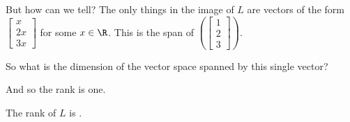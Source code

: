 \documentclass{ximera}
\begin{document}
\begin{question}
\begin{solution}
\begin{hint}
\begin{question}
        \begin{solution}
          \begin{multiple-choice}
          \end{multiple-choice}
        \end{solution}

        But how can we tell?  The only things in the image of $L$ are
        vectors of the form $\begin{bmatrix} x \\ 2x \\
          3x \end{bmatrix}$ for some $x \in \R$.  This is the span of $\left(\begin{bmatrix} 1 \\ 2 \\
          3 \end{bmatrix}\right)$.

        So what is the dimension of the vector space spanned by this single vector?
        \begin{solution}
          \begin{multiple-choice}
          \end{multiple-choice}
        \end{solution}        
        
        And so the rank is one.
      \end{question}
    \end{hint}
    
    The rank of $L$ is .
  \end{solution}
\end{question}
\end{document}
